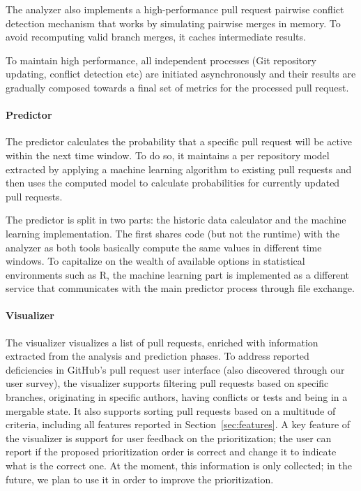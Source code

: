 \documentclass[conference]{IEEEtran}
\begin{document}
The analyzer also implements a high-performance pull request pairwise conflict
detection mechanism that works by simulating pairwise merges in memory. To avoid
recomputing valid branch merges, it caches intermediate results.

To maintain high performance, all independent processes (Git repository
updating, conflict detection etc) are initiated asynchronously and their
results are gradually composed towards a final set of metrics for the processed
pull request.

\paragraph{Predictor}
The predictor calculates the probability that a specific pull request will
be active within the next time window. To do so, it maintains a per repository
model extracted by applying a machine learning algorithm to existing pull
requests and then uses the computed model to calculate probabilities for
currently updated pull requests.

The predictor is split in two parts: the historic data calculator and
the machine learning implementation. The first shares code (but not the
runtime) with the analyzer as both tools basically compute the same
values in different time windows. To capitalize on the wealth of available
options in statistical environments such as R, the machine learning
part is implemented as a different service that communicates with the
main predictor process through file exchange.

\paragraph{Visualizer}

The visualizer visualizes a list of pull requests, enriched with information 
extracted from the analysis and prediction phases.  To address
reported deficiencies in GitHub's pull request user interface (also discovered
through our user survey), the visualizer supports filtering pull requests based
on specific branches, originating in specific authors, having conflicts or tests
and being in a mergable state.  It also supports sorting pull requests based on
a multitude of criteria, including all features reported in
Section~\ref{sec:features}.  A key feature of the visualizer is support for user
feedback on the prioritization; the user can report if the proposed
prioritization order is correct and change it to indicate what is the correct
one. At the moment, this information is only collected; in the future, we plan
to use it in order to improve the prioritization. %
\end{document}
